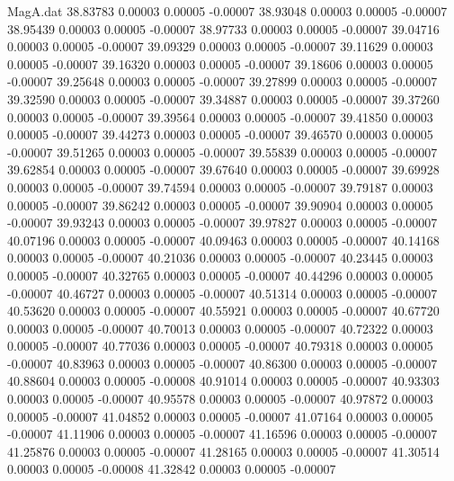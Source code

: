 \begin{filecontents}{MagA.dat}
  38.83783    0.00003    0.00005   -0.00007
  38.93048    0.00003    0.00005   -0.00007
  38.95439    0.00003    0.00005   -0.00007
  38.97733    0.00003    0.00005   -0.00007
  39.04716    0.00003    0.00005   -0.00007
  39.09329    0.00003    0.00005   -0.00007
  39.11629    0.00003    0.00005   -0.00007
  39.16320    0.00003    0.00005   -0.00007
  39.18606    0.00003    0.00005   -0.00007
  39.25648    0.00003    0.00005   -0.00007
  39.27899    0.00003    0.00005   -0.00007
  39.32590    0.00003    0.00005   -0.00007
  39.34887    0.00003    0.00005   -0.00007
  39.37260    0.00003    0.00005   -0.00007
  39.39564    0.00003    0.00005   -0.00007
  39.41850    0.00003    0.00005   -0.00007
  39.44273    0.00003    0.00005   -0.00007
  39.46570    0.00003    0.00005   -0.00007
  39.51265    0.00003    0.00005   -0.00007
  39.55839    0.00003    0.00005   -0.00007
  39.62854    0.00003    0.00005   -0.00007
  39.67640    0.00003    0.00005   -0.00007
  39.69928    0.00003    0.00005   -0.00007
  39.74594    0.00003    0.00005   -0.00007
  39.79187    0.00003    0.00005   -0.00007
  39.86242    0.00003    0.00005   -0.00007
  39.90904    0.00003    0.00005   -0.00007
  39.93243    0.00003    0.00005   -0.00007
  39.97827    0.00003    0.00005   -0.00007
  40.07196    0.00003    0.00005   -0.00007
  40.09463    0.00003    0.00005   -0.00007
  40.14168    0.00003    0.00005   -0.00007
  40.21036    0.00003    0.00005   -0.00007
  40.23445    0.00003    0.00005   -0.00007
  40.32765    0.00003    0.00005   -0.00007
  40.44296    0.00003    0.00005   -0.00007
  40.46727    0.00003    0.00005   -0.00007
  40.51314    0.00003    0.00005   -0.00007
  40.53620    0.00003    0.00005   -0.00007
  40.55921    0.00003    0.00005   -0.00007
  40.67720    0.00003    0.00005   -0.00007
  40.70013    0.00003    0.00005   -0.00007
  40.72322    0.00003    0.00005   -0.00007
  40.77036    0.00003    0.00005   -0.00007
  40.79318    0.00003    0.00005   -0.00007
  40.83963    0.00003    0.00005   -0.00007
  40.86300    0.00003    0.00005   -0.00007
  40.88604    0.00003    0.00005   -0.00008
  40.91014    0.00003    0.00005   -0.00007
  40.93303    0.00003    0.00005   -0.00007
  40.95578    0.00003    0.00005   -0.00007
  40.97872    0.00003    0.00005   -0.00007
  41.04852    0.00003    0.00005   -0.00007
  41.07164    0.00003    0.00005   -0.00007
  41.11906    0.00003    0.00005   -0.00007
  41.16596    0.00003    0.00005   -0.00007
  41.25876    0.00003    0.00005   -0.00007
  41.28165    0.00003    0.00005   -0.00007
  41.30514    0.00003    0.00005   -0.00008
  41.32842    0.00003    0.00005   -0.00007

\end{filecontents}
